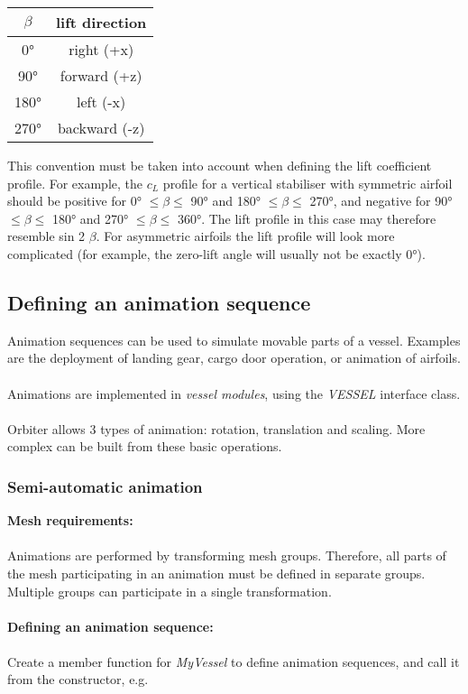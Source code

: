 \documentclass[Orbiter Developer Manual.tex]{subfiles}
\begin{document}
\begin{table}[H]
	\centering
	\begin{tabular}{ |c|c| }
	\hline\rule{0pt}{2ex}
	\textbf{$\beta$} & \textbf{lift direction} \\
	\hline\rule{0pt}{2ex}
	0° & right (+x)\\
	\hline\rule{0pt}{2ex}
	90° & forward (+z)\\
	\hline\rule{0pt}{2ex}
	180° & left (-x)\\
	\hline\rule{0pt}{2ex}
	270° & backward (-z)\\
	\hline
	\end{tabular}
\end{table}

\noindent
This convention must be taken into account when defining the lift coefficient profile. For example, the $c_{L}$ profile for a vertical stabiliser with symmetric airfoil should be positive for 0° $\leq \beta \leq$ 90° and 180° $\leq \beta \leq$ 270°, and negative for 90° $\leq \beta \leq$ 180° and 270° $\leq \beta \leq$ 360°. The lift profile in this case may therefore resemble sin 2 $\beta$. For asymmetric airfoils the lift profile will look more complicated (for example, the zero-lift angle will usually not be exactly 0°).


\subsection{Defining an animation sequence}
 \label{ssec:def_anim_sec}
Animation sequences can be used to simulate movable parts of a vessel. Examples are the deployment of landing gear, cargo door operation, or animation of airfoils.\\
\\
Animations are implemented in \textit{vessel modules}, using the \textit{VESSEL} interface class.\\
\\
Orbiter allows 3 types of animation: rotation, translation and scaling. More complex can be built from these basic operations.


\subsubsection{Semi-automatic animation}
\textbf{Mesh requirements:}\\
\\
Animations are performed by transforming mesh groups. Therefore, all parts of the mesh participating in an animation must be defined in separate groups. Multiple groups can participate in a single transformation.\\
\\
\textbf{Defining an animation sequence:}\\
\\
Create a member function for \textit{MyVessel} to define animation sequences, and call it from the constructor, e.g.
\end{document}
